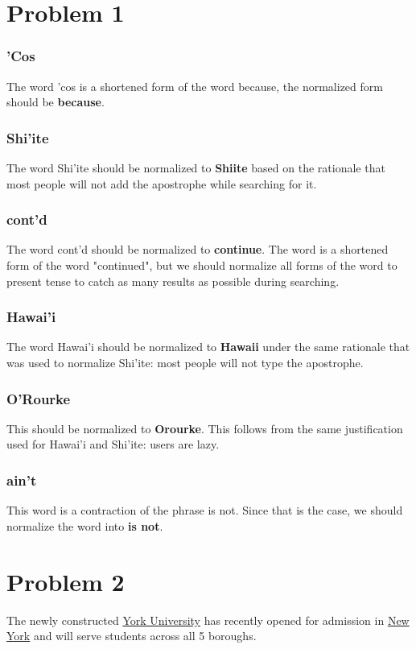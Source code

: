 \documentclass{article}%
\begin{document}
\section*{Problem 1}
\subsubsection*{'Cos}
The word 'cos is a shortened form of the word because, the normalized form should be \textbf{because}.
\subsubsection*{Shi'ite}
The word Shi'ite should be normalized to \textbf{Shiite} based on the rationale that most people will not add the apostrophe while searching for it.
\subsubsection*{cont'd}
The word cont'd should be normalized to \textbf{continue}. The word is a shortened form of the word "continued", but we should normalize all forms of the word to present tense to catch as many results as possible during searching.
\subsubsection*{Hawai'i}
The word Hawai'i should be normalized to \textbf{Hawaii} under the same rationale that was used to normalize Shi'ite: most people will not type the apostrophe.
\subsubsection*{O'Rourke}
This should be normalized to \textbf{Orourke}. This follows from the same justification used for Hawai'i and Shi'ite: users are lazy.
\subsubsection*{ain't}
This word is a contraction of the phrase is not. Since that is the case, we should normalize the word into \textbf{is not}.
\section*{Problem 2}

The newly constructed \underline{York University} has recently opened for admission in \underline{New York} and will serve students across all 5 boroughs.
\end{document}

